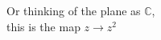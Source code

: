 \documentclass[preview]{standalone}
\begin{document}
\centering
Or thinking of the plane as $\mathds{C}$,\\
            this is the map $z \rightarrow z^2$
\end{document}

